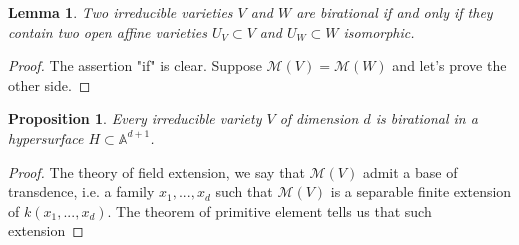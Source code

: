\documentclass[12pt,a4paper,english]{article}
\theoremstyle{plain}
\newtheorem{lem}[thm]{Lemma}
\newtheorem{prop}[thm]{Proposition}
\theoremstyle{definition}
\theoremstyle{remark}
\begin{document}
\begin{lem}
Two irreducible varieties $V$ and $W$ are birational if and only if they contain two open affine varieties $U_{V}\subset V$ and $U_{W}\subset W$ isomorphic.
\end{lem}
\begin{proof}
The assertion "if" is clear. Suppose $\mathcal{M}(V)=\mathcal{M}(W)$ and let's prove the other side.


\end{proof}
\begin{prop}
Every irreducible variety $V$ of dimension $d$ is birational in a hypersurface $H\subset \mathbb{A}^{d+1}$.
\end{prop}
\begin{proof}
The theory of field extension, we say that $\mathcal{M}(V)$ admit a base of transdence, i.e.  a family $x_{1},...,x_{d}$ such that $\mathcal{M}(V)$ is a separable finite extension of  $k(x_{1},...,x_{d})$. The theorem of primitive element tells us that such extension 
\end{proof}
\end{document}
